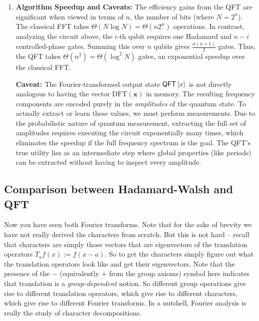 \begin{enumerate}
    \item \textbf{Algorithm Speedup and Caveats:}
    The efficiency gains from the QFT are significant when viewed in terms of $n$, the number of bits (where $N = 2^n$). The classical FFT takes $\Theta(N \log N) = \Theta(n2^n)$ operations. In contrast, analyzing the circuit above, the $i$-th qubit requires one Hadamard and $n-i$ controlled-phase gates. Summing this over $n$ qubits gives $\frac{n(n+1)}{2}$ gates. Thus, the QFT takes $\Theta(n^2) = \Theta(\log^2 N)$ gates, an exponential speedup over the classical FFT.
    
    \textbf{Caveat:} The Fourier-transformed output state $\mathsf{QFT}\ket{x}$ is not directly analogous to having the vector $\text{DFT}(\mathbf{x})$ in memory. The resulting frequency components are encoded purely in the \textit{amplitudes} of the quantum state. To actually extract or learn these values, we must perform measurements. Due to the probabilistic nature of quantum measurement, extracting the full set of amplitudes requires executing the circuit exponentially many times, which eliminates the speedup if the full frequency spectrum is the goal. The QFT's true utility lies as an intermediate step where global properties (like periods) can be extracted without having to inspect every amplitude.
\end{enumerate}

\subsection{Comparison between Hadamard-Walsh and QFT}
Now you have seen both Fourier transforms. Note that for the sake of brevity we have not really derived the characters from scratch. But this is not hard -- recall that characters are simply those vectors that are eigenvectors of the translation operators $T_af(x) := f(x-a)$. So to get the characters simply figure out what the translation operators look like and get their eigenvectors. Note that the presence of the $-$ (equivalently $+$ from the group axioms) symbol here indicates that translation is a \textit{group-dependent} notion. So different group operations give rise to different translation operators, which give rise to different characters, which give rise to different Fourier transforms. In a nutshell, Fourier analysis is really the study of character decompositions. 

